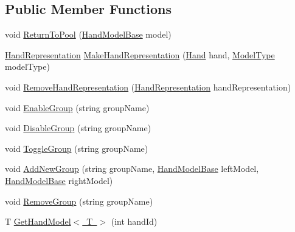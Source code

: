 \subsection*{Public Member Functions}
\begin{DoxyCompactItemize}
\item 
void \mbox{\hyperlink{class_leap_1_1_unity_1_1_hand_model_manager_a3786bfa074d0fdc61caf5069937a2d18}{Return\+To\+Pool}} (\mbox{\hyperlink{class_leap_1_1_unity_1_1_hand_model_base}{Hand\+Model\+Base}} model)
\item 
\mbox{\hyperlink{class_leap_1_1_unity_1_1_hand_representation}{Hand\+Representation}} \mbox{\hyperlink{class_leap_1_1_unity_1_1_hand_model_manager_a9f0b658a31543c0ec44cc354e0a0007b}{Make\+Hand\+Representation}} (\mbox{\hyperlink{class_leap_1_1_hand}{Hand}} hand, \mbox{\hyperlink{namespace_leap_1_1_unity_a186e5eb0a2b743f1f6b79346f0ab8ad0}{Model\+Type}} model\+Type)
\item 
void \mbox{\hyperlink{class_leap_1_1_unity_1_1_hand_model_manager_a12fa966bd834e38d30e37c10c14c3be4}{Remove\+Hand\+Representation}} (\mbox{\hyperlink{class_leap_1_1_unity_1_1_hand_representation}{Hand\+Representation}} hand\+Representation)
\item 
void \mbox{\hyperlink{class_leap_1_1_unity_1_1_hand_model_manager_a4d6c8b759ff06758408ec0228a006417}{Enable\+Group}} (string group\+Name)
\item 
void \mbox{\hyperlink{class_leap_1_1_unity_1_1_hand_model_manager_a177e891c24a7008b823c0d2d48696171}{Disable\+Group}} (string group\+Name)
\item 
void \mbox{\hyperlink{class_leap_1_1_unity_1_1_hand_model_manager_a2657cfc87b50f304816fbf1539f87dd0}{Toggle\+Group}} (string group\+Name)
\item 
void \mbox{\hyperlink{class_leap_1_1_unity_1_1_hand_model_manager_acd9886df388682426cd975688e929cd4}{Add\+New\+Group}} (string group\+Name, \mbox{\hyperlink{class_leap_1_1_unity_1_1_hand_model_base}{Hand\+Model\+Base}} left\+Model, \mbox{\hyperlink{class_leap_1_1_unity_1_1_hand_model_base}{Hand\+Model\+Base}} right\+Model)
\item 
void \mbox{\hyperlink{class_leap_1_1_unity_1_1_hand_model_manager_aa85896c2f7d1b17021f0fb1d3a1086c2}{Remove\+Group}} (string group\+Name)
\item 
T \mbox{\hyperlink{class_leap_1_1_unity_1_1_hand_model_manager_a387a153890d97fea2fd72118fb5dfe53}{Get\+Hand\+Model$<$ T $>$}} (int hand\+Id)
\end{DoxyCompactItemize}
